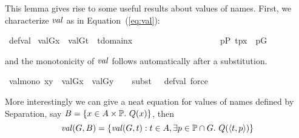 This lemma gives rise to some useful results about values of
names. First, we characterize $\operatorname{\mathit{val}}$ as in Equation~(\ref{eq:val}):
\begin{isabelle}
  \isamarkupfalse%
  \ def{\isacharunderscore}val{\isacharcolon}\isanewline
  \ {\isachardoublequoteopen}val{\isacharparenleft}G{\isacharcomma}x{\isacharparenright}\ {\isacharequal}\ {\isacharbraceleft}val{\isacharparenleft}G{\isacharcomma}t{\isacharparenright}\ {\isachardot}{\isachardot}\ t{\isasymin}domain{\isacharparenleft}x{\isacharparenright}\ {\isacharcomma}\isanewline
\ \ \ \ \ \ \ \ \ \ \ \ \ \ \ \ \ \ \ {\isasymexists}p{\isasymin}P{\isachardot}\ {\isacharless}t{\isacharcomma}p{\isachargreater}{\isasymin}x\ {\isasymand}\ p{\isasymin}G\ {\isacharbraceright}{\isachardoublequoteclose}
\end{isabelle}
and the monotonicity of $\operatorname{\mathit{val}}$ follows automatically after a
substitution.
\begin{isabelle}
\isamarkupfalse%
\ val{\isacharunderscore}mono{\isacharcolon}\ {\isachardoublequoteopen}x{\isasymsubseteq}y\ {\isasymLongrightarrow}\ val{\isacharparenleft}G{\isacharcomma}x{\isacharparenright}\ {\isasymsubseteq}\ val{\isacharparenleft}G{\isacharcomma}y{\isacharparenright}{\isachardoublequoteclose}\isanewline
%
\ \ \isamarkupfalse%
\ {\isacharparenleft}subst\ {\isacharparenleft}{}\ {}{\isacharparenright}\ def{\isacharunderscore}val{\isacharcomma}\ force{\isacharparenright}%
\end{isabelle}
More interestingly we can give a neat equation for values of
names defined by Separation, say $B = \{x\in A\times \mathbb{P}.\ Q(x)\}$,
then
\begin{equation}
\val(G,B) = \{\val(G,t) : t\in A , \exists p\in \PP \cap G.\ Q(\lb t,p\rb) \} \label{eq:val-name-sep}
\end{equation}



